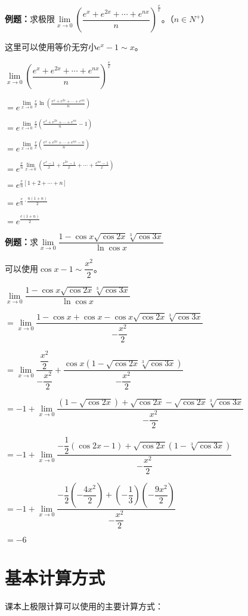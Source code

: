 \documentclass[UTF8, 12pt]{ctexart}
\begin{document}
\textbf{例题：}求极限$\lim\limits_{x\to 0}\left(\dfrac{e^x+e^{2x}+\cdots+e^{nx}}{n}\right)^{\frac{e}{x}}$。（$n\in N^+$）

这里可以使用等价无穷小$e^x-1\sim x$。

$\lim\limits_{x\to 0}\left(\dfrac{e^x+e^{2x}+\cdots+e^{nx}}{n}\right)^{\frac{e}{x}}$

$=e^{\lim\limits_{x\to 0}\frac{e}{x}\ln\left(\frac{e^x+e^{2x}+\cdots+e^{nx}}{n}\right)}$

$=e^{\lim\limits_{x\to 0}\frac{e}{x}\left(\frac{e^x+e^{2x}+\cdots+e^{nx}}{n}-1\right)}$

$=e^{\lim\limits_{x\to 0}\frac{e}{x}\left(\frac{e^x+e^{2x}+\cdots+e^{nx}-n}{n}\right)}$

$=e^{\frac{e}{n}\lim\limits_{x\to 0}\left(\frac{e^x-1}{x}+\frac{e^{2x}-1}{x}+\cdots+\frac{e^{nx}-1}{x}\right)}$

$=e^{\frac{e}{n}[1+2+\cdots+n]}$

$=e^{\frac{e}{n}\cdot\frac{n(1+n)}{2}}$

$=e^{\frac{e(1+n)}{2}}$

\textbf{例题：}求$\lim\limits_{x\to 0}\dfrac{1-\cos x\sqrt{\cos 2x}\sqrt[3]{\cos 3x}}{\ln\cos x}$\medskip

可以使用$\cos x-1\sim\dfrac{x^2}{2}$。\medskip

$\lim\limits_{x\to 0}\dfrac{1-\cos x\sqrt{\cos 2x}\sqrt[3]{\cos 3x}}{\ln\cos x}$

$=\lim\limits_{x\to 0}\dfrac{1-\cos x+\cos x-\cos x\sqrt{\cos 2x}\sqrt[3]{\cos 3x}}{-\dfrac{x^2}{2}}$

$=\lim\limits_{x\to 0}\dfrac{\dfrac{x^2}{2}}{-\dfrac{x^2}{2}}+\dfrac{\cos x(1-\sqrt{\cos 2x}\sqrt[3]{\cos 3x})}{-\dfrac{x^2}{2}}$

$=-1+\lim\limits_{x\to 0}\dfrac{(1-\sqrt{\cos 2x})+\sqrt{\cos 2x}-\sqrt{\cos 2x}\sqrt[3]{\cos 3x}}{-\dfrac{x^2}{2}}$

$=-1+\lim\limits_{x\to 0}\dfrac{-\dfrac{1}{2}(\cos 2x-1)+\sqrt{\cos 2x}(1-\sqrt[3]{\cos 3x})}{-\dfrac{x^2}{2}}$

$=-1+\lim\limits_{x\to 0}\dfrac{-\dfrac{1}{2}(-\dfrac{4x^2}{2})+\left(-\dfrac{1}{3}\right)\left(-\dfrac{9x^2}{2}\right)}{-\dfrac{x^2}{2}}$

$=-6$

\section{基本计算方式}

课本上极限计算可以使用的主要计算方式：
\end{document}

